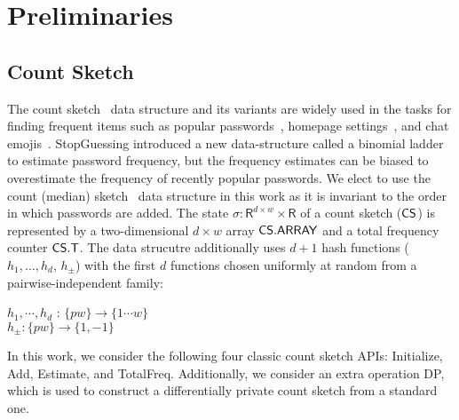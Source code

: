 

\vspace{-0.2cm}
\section{Preliminaries} \label{section:Prelinmaries}
\vspace{-0.2cm}



\subsection{Count Sketch}\label{section:Prelinmaries-CountSketch} %

The count sketch~\cite{ICALP:ChaCheFar02} data structure and its variants are widely used in the tasks for finding frequent items such as popular passwords~\cite{CCS:NaoPinRon19}, homepage settings~\cite{CCS:ErlPihKor14}, and chat emojis~\cite{AppleDP}. StopGuessing\cite{EuroSP:THS19} introduced a new data-structure called a binomial ladder to estimate password frequency, but the frequency estimates can be biased to overestimate the frequency of recently popular passwords. We elect to use the count (median) sketch~\cite{ICALP:ChaCheFar02} data structure in this work as it is invariant to the order in which passwords are added. The state $\sigma: \mathsf{R}^{d\times w} \times \mathsf{R}$ of a count sketch ($\mathsf{CS}$) is represented by a two-dimensional $d\times w$ array $\mathsf{CS.ARRAY}$ and a total frequency counter $\mathsf{CS.T}$. The data strucutre additionally uses $d+1$ hash functions ($h_1, \ldots, h_d$, $h_{\pm}$) with the first $d$ functions chosen uniformly at random from a pairwise-independent family:  
	
	\begin{center}
		
		$h_1, \cdots, h_d$ : $\{pw\} \rightarrow \{1\cdots w\}$\\
		
		$h_{\pm} : \{pw\} \rightarrow \{1, -1\}$\\
		
	\end{center}
	


In this work, we consider the following four classic count sketch APIs: Initialize, Add, Estimate, and TotalFreq. Additionally, we consider an extra operation DP, which is used to construct a differentially private count sketch from a standard one.


